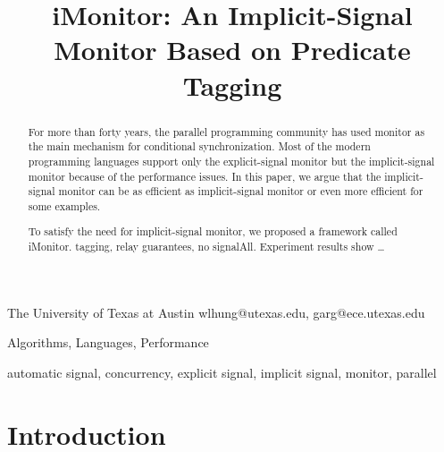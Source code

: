 \documentclass[preprint]{sigplanconf}
\begin{document}
\copyrightdata{[to be supplied]} 


\title{iMonitor: An Implicit-Signal Monitor Based on Predicate Tagging}
\subtitle{}

           {The University of Texas at Austin}
           {wlhung@utexas.edu, garg@ece.utexas.edu}

\maketitle

\begin{abstract}
For more than forty years, the parallel programming community has used monitor 
as the main mechanism for conditional synchronization. Most of the modern 
programming languages support only the explicit-signal monitor but the 
implicit-signal monitor because of the performance issues. In this paper, we 
argue that the implicit-signal monitor can be as efficient as implicit-signal
monitor or even more efficient for some examples.

To satisfy the need for implicit-signal monitor, we proposed a framework called 
iMonitor. tagging, relay guarantees, no signalAll. Experiment results show
\dots

\end{abstract}


\terms
Algorithms, Languages, Performance 

\keywords
automatic signal, concurrency, explicit signal, implicit signal, monitor, 
parallel









\section{Introduction} \label{sec:intro}
\end{document}
